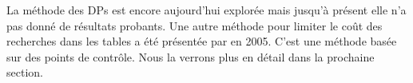 
		La méthode des \glspl{DP} est encore aujourd'hui explorée mais jusqu'à présent elle n'a pas donné de résultats probants. Une autre méthode pour limiter le coût des recherches dans les tables a été présentée par \cite{checkpoints} en 2005. C'est une méthode basée sur des points de contrôle. Nous la verrons plus en détail dans la prochaine section.

\endinput{}
